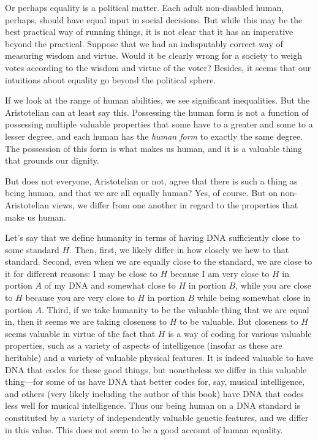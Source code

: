 Or perhaps equality is a political matter. Each adult non-disabled human, perhaps, should have equal 
input in social decisions. But while this may be the best practical way of running things, it is not
clear that it has an imperative beyond the practical. Suppose that we had an indisputably correct way
of measuring wisdom and virtue. Would it be clearly wrong for a society to weigh votes according to 
the wisdom and virtue of the voter? Besides, it seems that our intuitions about equality go beyond
the political sphere.

If we look at the range of human abilities, we see significant inequalities. But the Aristotelian can at least say
this. Possessing the human form is not a function of possessing multiple valuable properties that some have to a 
greater and some to a lesser degree, and each human has the \textit{human form} to exactly the same degree. The 
possession of this form is what makes us human, and it is a valuable thing that grounds our dignity. 

But does not everyone, Aristotelian or not, agree that there is such a thing as being human, and that we are all 
equally human? Yes, of course. But on non-Aristotelian views, we differ from one another in regard to the properties
that make us human. 

Let's say that we define humanity in terms of having DNA sufficiently close to some standard $H$.
Then, first, we likely differ in how closely we hew to that standard. Second, even when we are equally close to the
standard, we are close to it for different reasons: I may be close to $H$ because I am very close to $H$ in portion $A$ of
my DNA and somewhat close to $H$ in portion $B$, while you are close to $H$ because you are very close to $H$ in portion
$B$ while being somewhat close in portion $A$. Third, if we take humanity to be the valuable thing that we are equal in,
then it seems we are taking closeness to $H$ to be valuable. But closeness to $H$ seems valuable in virtue of the fact
that $H$ is a way of coding for various valuable properties, such as a variety of aspects of intelligence (insofar as these
are heritable) and a variety of valuable physical features. It is indeed valuable to have DNA that codes for these good
things, but nonetheless we differ in this valuable thing---for some of us have DNA that better codes for, say, musical
intelligence, and others (very likely including the author of this book) have DNA that codes less well for musical 
intelligence. Thus our being human on a DNA standard is constituted by a variety of independently valuable genetic features,
and we differ in this value. This does not seem to be a good account of human equality.

